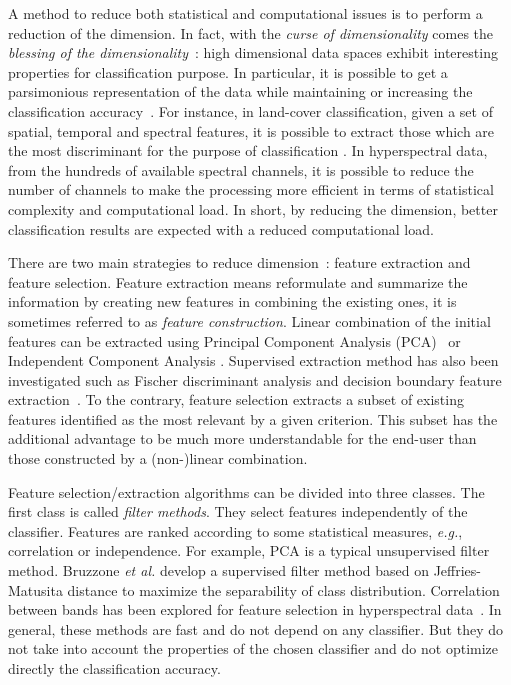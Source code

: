\documentclass[journal,10pt]{IEEEtran}
\begin{document}
A method  to reduce  both statistical and  computational issues  is to
perform a reduction of the dimension. In fact, with the \emph{curse of
  dimensionality}     comes     the      \emph{blessing     of     the
  dimensionality}~\cite{bouveyron2014model}:  high   dimensional  data
spaces   exhibit  interesting   properties   for    classification
purpose.  In  particular,  it  is   possible  to  get  a  parsimonious
representation  of  the  data  while  maintaining  or  increasing  the
classification  accuracy~\cite{jimenez1998supervised}.  For  instance,
in land-cover  classification, given  a set  of spatial,  temporal and
spectral features, it is possible to  extract those which are the most
discriminant      for      the     purpose      of      classification
\cite{fassnacht2014comparison}.   In  hyperspectral   data,  from  the
hundreds of available spectral channels,  it is possible to reduce the
number of channels  to make the processing more efficient  in terms of
statistical complexity  and computational load. In  short, by reducing
the dimension, better classification results are expected with a reduced
computational load.

There  are  two  main  strategies  to  reduce  dimension~\cite[Chapter
1]{Guyon:2006:FEF:1208773}: feature extraction and feature selection.
Feature extraction means reformulate  and summarize the information by
creating new features in combining  the existing ones, it is sometimes
referred to as \emph{feature construction}.  Linear combination of the
initial features  can be extracted using  Principal Component Analysis
(PCA)~\cite{jimenez1998supervised}  or Independent  Component Analysis
\cite{villa2011hyperspectral}.  Supervised extraction  method has also
been investigated  such as Fischer discriminant  analysis and decision
boundary feature  extraction~\cite{book:landgrebe}.  To  the contrary,
feature selection  extracts a subset of  existing features identified
as  the most  relevant  by a  given criterion.   This  subset has  the
additional advantage to  be much more understandable  for the end-user
than those constructed by a (non-)linear combination.

Feature selection/extraction algorithms can be divided into three classes. The first class is called \emph{filter methods}. They select features independently of the classifier. Features are ranked according to some statistical measures, \emph{e.g.}, correlation or independence. For example,  PCA is a typical unsupervised filter method. Bruzzone \emph{et al.}\cite{bruzzone1995extension} develop a supervised filter method based on Jeffries-Matusita distance to maximize the separability of class distribution. Correlation between bands has been explored for feature selection in hyperspectral data~\cite{demir2008phase}. In general, these methods are fast and do not depend on any classifier. But they do not take into account the properties of the chosen classifier and do not optimize directly the classification accuracy.
\end{document}
